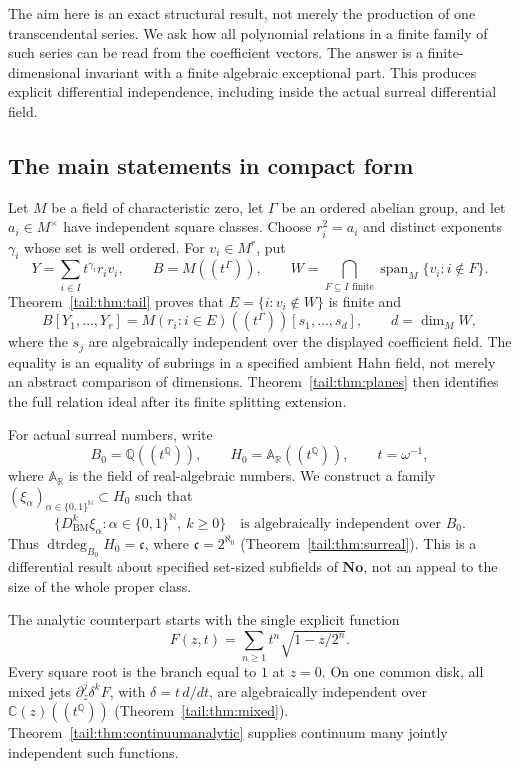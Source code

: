 \documentclass[11pt,a4paper]{article}
\numberwithin{equation}{section}
\theoremstyle{definition}
\theoremstyle{remark}
\newcommand{\No}{\mathbf{No}}
\newcommand{\R}{\mathbb R}
\newcommand{\C}{\mathbb C}
\newcommand{\Q}{\mathbb Q}
\newcommand{\N}{\mathbb N}
\newcommand{\AR}{\mathbb A_{\R}}
\newcommand{\Span}{\operatorname{span}}
\newcommand{\dtrdeg}{\operatorname{dtrdeg}}
\newcommand{\BM}{D_{\mathrm{BM}}}
\newcommand{\EDer}{\delta}
\newcommand{\cf}{\mathfrak c}
\begin{document}
The aim here is an exact structural result, not merely the production of
one transcendental series. We ask how all polynomial relations in a finite
family of such series can be read from the coefficient vectors. The answer
is a finite-dimensional invariant with a finite algebraic exceptional part.
This produces explicit differential independence, including inside the
actual surreal differential field.

\subsection{The main statements in compact form}
Let $M$ be a field of characteristic zero, let $\Gamma$ be an ordered
abelian group, and let $a_i\in M^\times$ have independent square classes.
Choose $r_i^2=a_i$ and distinct exponents $\gamma_i$ whose set is well
ordered. For $v_i\in M^r$, put
\begin{equation}\label{tail:eq:introY}
 Y=\sum_{i\in I} t^{\gamma_i}r_i v_i,
 \qquad B=M((t^\Gamma)),
 \qquad W=\bigcap_{F\subseteq I\text{ finite}}
       \Span_M\{v_i:i\notin F\}.
\end{equation}
Theorem~\ref{tail:thm:tail} proves that $E=\{i:v_i\notin W\}$ is finite and
\begin{equation}\label{tail:eq:intromain}
 B[Y_1,\ldots,Y_r]
   =M(r_i:i\in E)((t^\Gamma))[s_1,\ldots,s_d],
 \qquad d=\dim_M W,
\end{equation}
where the $s_j$ are algebraically independent over the displayed
coefficient field. The equality is an equality of subrings in a specified
ambient Hahn field, not merely an abstract comparison of dimensions.
Theorem~\ref{tail:thm:planes} then identifies the full relation ideal after its
finite splitting extension.

For actual surreal numbers, write
\[
 B_0=\Q((t^\Q)),\qquad H_0=\AR((t^\Q)),\qquad t=\omega^{-1},
\]
where $\AR$ is the field of real-algebraic numbers. We construct a family
$(\xi_\alpha)_{\alpha\in\{0,1\}^{\N}}\subset H_0$ such that
\begin{equation}\label{tail:eq:introBM}
 \bigl\{\BM^k\xi_\alpha:
        \alpha\in\{0,1\}^{\N},\ k\geq0\bigr\}
 \quad\text{is algebraically independent over }B_0.
\end{equation}
Thus $\dtrdeg_{B_0}H_0=\cf$, where $\cf=2^{\aleph_0}$
(Theorem~\ref{tail:thm:surreal}). This is a differential result about specified
set-sized subfields of $\No$, not an appeal to the size of the whole
proper class.

The analytic counterpart starts with the single explicit function
\begin{equation}\label{tail:eq:introF}
 F(z,t)=\sum_{n\geq1}t^n\sqrt{1-z/2^n}.
\end{equation}
Every square root is the branch equal to $1$ at $z=0$. On one common disk,
all mixed jets $\partial_z^j\EDer^kF$, with $\EDer=t\,d/dt$, are
algebraically independent over $\C(z)((t^\Q))$
(Theorem~\ref{tail:thm:mixed}). Theorem~\ref{tail:thm:continuumanalytic} supplies
continuum many jointly independent such functions.
\end{document}
